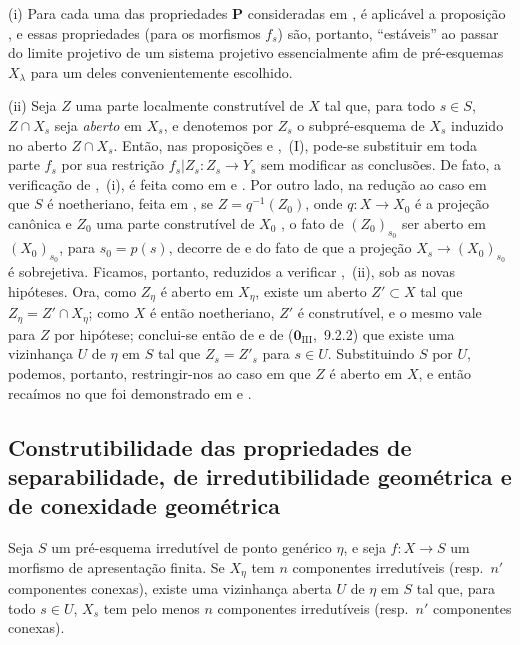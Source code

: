 \begin{remarks}[9.6.7]
\label{IV.9.6.7}
(i) Para cada uma das propriedades $\mathbf{P}$ consideradas em , é aplicável a proposição , e essas propriedades (para os morfismos $f_s$) são, portanto, ``estáveis'' ao passar do limite projetivo de um sistema projetivo essencialmente afim  de pré-esquemas $X_\lambda$ para um deles convenientemente escolhido.

(ii) Seja $Z$ uma parte localmente construtível de $X$ tal que, para todo $s\in S$, $Z\cap X_s$ seja \emph{aberto} em $X_s$, e denotemos por $Z_s$ o subpré-esquema de $X_s$ induzido no aberto $Z\cap X_s$.
Então, nas proposições  e ,~(I), pode-se substituir em toda parte $f_s$ por sua restrição $f_s|Z_s:Z_s\to Y_s$ sem modificar as conclusões.
De fato, a verificação de ,~(i), é feita como em  e .
Por outro lado, na redução ao caso em que $S$ é noetheriano, feita em , se $Z=q^{-1}(Z_0)$, onde $q:X\to X_0$ é a projeção canônica e $Z_0$ uma parte construtível de $X_0$ , o fato de $(Z_0)_{s_0}$ ser aberto em $(X_0)_{s_0}$, para $s_0=p(s)$, decorre de  e do fato de que a projeção $X_s\to(X_0)_{s_0}$ é sobrejetiva.
Ficamos, portanto, reduzidos a verificar ,~(ii), sob as novas hipóteses.
Ora, como $Z_\eta$ é aberto em $X_\eta$, existe um aberto $Z'\subset X$ tal que $Z_\eta=Z'\cap X_\eta$; como $X$ é então noetheriano, $Z'$ é construtível, e o mesmo vale para $Z$ por hipótese; conclui-se então de  e de ($\mathbf{0}_{\mathrm{III}}$,~9.2.2) que existe uma vizinhança $U$ de $\eta$ em $S$ tal que $Z_s=Z'_s$ para $s\in U$.
Substituindo $S$ por $U$, podemos, portanto, restringir-nos ao caso em que $Z$ é aberto em $X$, e então recaímos no que foi demonstrado em  e .
\end{remarks}

\subsection{Construtibilidade das propriedades de separabilidade, de irredutibilidade geométrica e de conexidade geométrica}
\label{subsection:IV.9.7}
\label{IV.9.7}

\begin{lemma}[9.7.1]
\label{IV.9.7.1}
Seja $S$ um pré-esquema irredutível de ponto genérico $\eta$, e seja $f:X\to S$ um morfismo de apresentação finita.
Se $X_\eta$ tem $n$ componentes irredutíveis (resp.\ $n'$ componentes conexas), existe uma vizinhança aberta $U$ de $\eta$ em $S$ tal que, para todo $s\in U$, $X_s$ tem pelo menos $n$ componentes irredutíveis (resp.\ $n'$ componentes conexas).
\end{lemma}

